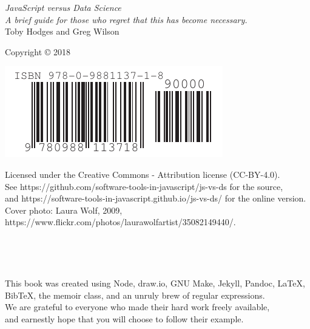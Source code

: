 \documentclass[10pt,statementpaper]{memoir}
\begin{document}
\pagestyle{empty}

{\begingroup
  \raggedleft
  \vspace*{\baselineskip}

  {\Huge\itshape JavaScript versus Data Science}\\[\baselineskip]

  {\large\itshape
    A brief guide for those who regret that this has become necessary.
  }\\[0.2\textheight]

  {\large Toby Hodges and Greg Wilson}\par

  \vfill

  {\large Copyright {\copyright} 2018}

  \vspace*{\baselineskip}

  \includegraphics{../../etc/isbn-barcode.pdf}

  \vspace*{\baselineskip}

  {\small
    Licensed under the Creative Commons - Attribution license (CC-BY-4.0).
    \\
    See https://github.com/software-tools-in-javascript/js-vs-ds for the source,
    \\
    and https://software-tools-in-javascript.github.io/js-vs-ds/ for the online version.
    \\
    Cover photo: Laura Wolf, 2009, https://www.flickr.com/photos/laurawolfartist/35082149440/.
  }

\endgroup}

\newpage

\pagestyle{empty}

~

\newpage

\tableofcontents

\newpage

\pagestyle{empty}

~

\newpage

\pagestyle{plain}



\cleartoverso
{\begingroup
  \raggedleft
  \vspace*{4\baselineskip}
  This book was created using Node, draw.io, GNU Make, Jekyll, Pandoc, LaTeX, BibTeX, the memoir class,
  and an unruly brew of regular expressions. \\
  We are grateful to everyone who made their hard work freely available, \\
  and earnestly hope that you will choose to follow their example.

\endgroup}
\end{document}
